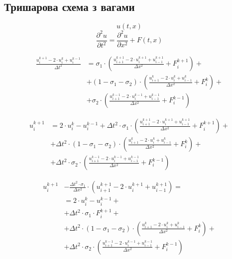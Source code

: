\documentclass{article}
\begin{document}
        \subsection{Тришарова схема з вагами}
            \label{subsec:main}
            $$ u(t, x) $$
            $$ \frac{\partial^2{u}}{\partial{t^2}} = \frac{\partial^2{u}}{\partial{x^2}} + F(t, x) $$
            
            \begin{align*}
                \frac{u_i^{k+1} - 2 \cdot u_i^{k} + u_i^{k-1}}{\Delta{t}^2}& = \sigma_1 \cdot \left(\frac{u_{i+1}^{k+1} - 2 \cdot u_i^{k+1} + u_{i-1}^{k+1}}{\Delta{x}^2} + F_i^{k+1}\right) + \\
                & + \left(1 - \sigma_1 - \sigma_2 \right) \cdot \left(\frac{u_{i+1}^{k} - 2 \cdot u_i^{k} + u_{i-1}^{k}}{\Delta{x}^2} + F_i^{k}\right) + \\
                & + \sigma_2 \cdot \left(\frac{u_{i+1}^{k-1} - 2 \cdot u_i^{k-1} + u_{i-1}^{k-1}}{\Delta{x}^2} + F_i^{k-1}\right)
            \end{align*}
            
            \begin{align*}
                u_i^{k+1} & = 2 \cdot u_i^{k} - u_i^{k-1} + \Delta{t}^2 \cdot \sigma_1 \cdot \left(\frac{u_{i+1}^{k+1} - 2 \cdot u_i^{k+1} + u_{i-1}^{k+1}}{\Delta{x}^2} + F_i^{k+1}\right) + \\
                & + \Delta{t}^2 \cdot \left(1 - \sigma_1 - \sigma_2 \right) \cdot \left(\frac{u_{i+1}^{k} - 2 \cdot u_i^{k} + u_{i-1}^{k}}{\Delta{x}^2} + F_i^{k}\right) + \\
                & + \Delta{t}^2 \cdot \sigma_2 \cdot \left(\frac{u_{i+1}^{k-1} - 2 \cdot u_i^{k-1} + u_{i-1}^{k-1}}{\Delta{x}^2} + F_i^{k-1}\right)
            \end{align*}
            
            \begin{align*}
                u_i^{k+1} & - \frac{\Delta{t}^2 \cdot \sigma_1}{\Delta{x}^2} \cdot \left(u_{i+1}^{k+1} - 2 \cdot u_i^{k+1} + u_{i-1}^{k+1}\right) = \\
                & = 2 \cdot u_i^{k} - u_i^{k-1}  + \\
                & + \Delta{t}^2 \cdot \sigma_1 \cdot F_i^{k+1} + \\
                & + \Delta{t}^2 \cdot \left(1 - \sigma_1 - \sigma_2 \right) \cdot \left(\frac{u_{i+1}^{k} - 2 \cdot u_i^{k} + u_{i-1}^{k}}{\Delta{x}^2} + F_i^{k}\right) + \\
                & + \Delta{t}^2 \cdot \sigma_2 \cdot \left(\frac{u_{i+1}^{k-1} - 2 \cdot u_i^{k-1} + u_{i-1}^{k-1}}{\Delta{x}^2} + F_i^{k-1}\right)
            \end{align*}
\end{document}
